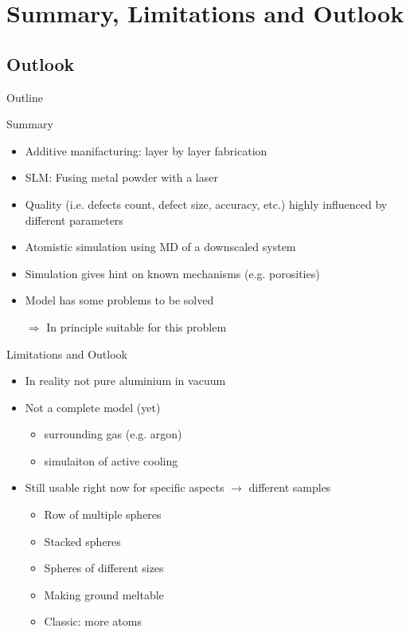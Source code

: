 \section[Summary]{Summary, Limitations and Outlook}
\subsection*{Outlook}
\begin{frame}{Outline}
	\tableofcontents[currentsection]
\end{frame}


\begin{frame}{Summary}
	\begin{itemize}[<+->]
		\item Additive manifacturing: layer by layer fabrication
		\item SLM: Fusing metal powder with a laser
		\item Quality (i.e. defects count, defect size, accuracy, etc.) highly influenced by different parameters
		\item Atomistic simulation using MD of a downscaled system
		\item Simulation gives hint on known mechanisms (e.g. porosities)
		\item Model has some problems to be solved
		\vspace{1cm}
		\item[$\Rightarrow$] In principle suitable for this problem
	\end{itemize}
\end{frame}


\begin{frame}{Limitations and Outlook}
	\begin{itemize}[<+->]
		\item In reality not pure aluminium in vacuum
		\item Not a complete model (yet)
		\begin{itemize}
			\item surrounding gas (e.g. argon)
			\item simulaiton of active cooling
		\end{itemize}
		\item Still usable right now for specific aspects $\rightarrow$ different samples
		\begin{itemize}
			\item Row of multiple spheres
			\item Stacked spheres
			\item Spheres of different sizes
			\item Making ground meltable
			\item Classic: more atoms
		\end{itemize}
	\end{itemize}
\end{frame}
